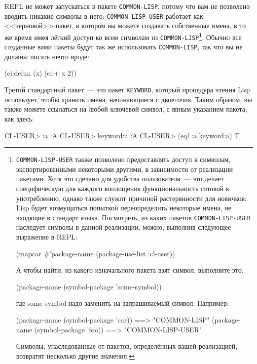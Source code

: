 REPL не может запускаться в пакете \lstinline{COMMON-LISP}, потому что вам не позволено вводить
никакие символы в него; \lstinline{COMMON-LISP-USER} работает как <<черновой>> пакет, в котором вы
можете создавать собственные имена, в то же время имея лёгкий доступ ко всем символам из
\lstinline{COMMON-LISP}\footnote{\lstinline{COMMON-LISP-USER} также позволено предоставлять доступ
  к символам, экспортированными некоторыми другими, в зависимости от реализации
  пакетами. Хотя это сделано для удобства пользователя~--- это делает специфическую для
  каждого воплощения функциональность готовой к употреблению, однако также служит
  причиной растерянности для новичков: Lisp будет возмущаться попыткой переопределить
  некоторые имена, не входящие в стандарт языка. Посмотреть, из каких пакетов
  \lstinline{COMMON-LISP-USER} наследует символы в данной реализации, можно, выполнив следующее
  выражение в REPL:

\begin{myverb}
(mapcar #'package-name (package-use-list :cl-user))
\end{myverb}

А чтобы найти, из какого изначального пакета взят символ, выполните это:

\begin{myverb}
(package-name (symbol-package 'some-symbol))
\end{myverb}

\noindent{}где some-symbol надо заменить на запрашиваемый символ. Например:

\begin{myverb}
(package-name (symbol-package 'car)) ==> "COMMON-LISP"
(package-name (symbol-package 'foo)) ==> "COMMON-LISP-USER"
\end{myverb}

Символы, унаследованные от пакетов, определённых вашей реализацией, возвратят несколько
другие значения.}. Обычно все созданные вами пакеты будут так же использовать
\lstinline{COMMON-LISP}, так что вы не должны писать нечто вроде:

\begin{myverb}
(cl:defun (x) (cl:+ x 2))
\end{myverb}

Третий стандартный пакет~--- это пакет \lstinline{KEYWORD}, который процедура чтения Lisp
использует, чтобы хранить имена, начинающиеся с двоеточия. Таким образом, вы также можете
ссылаться на любой ключевой символ, с явным указанием пакета, как здесь:

\begin{myverb}
CL-USER> :a
:A
CL-USER> keyword:a
:A
CL-USER> (eql :a keyword:a)
T
\end{myverb}

